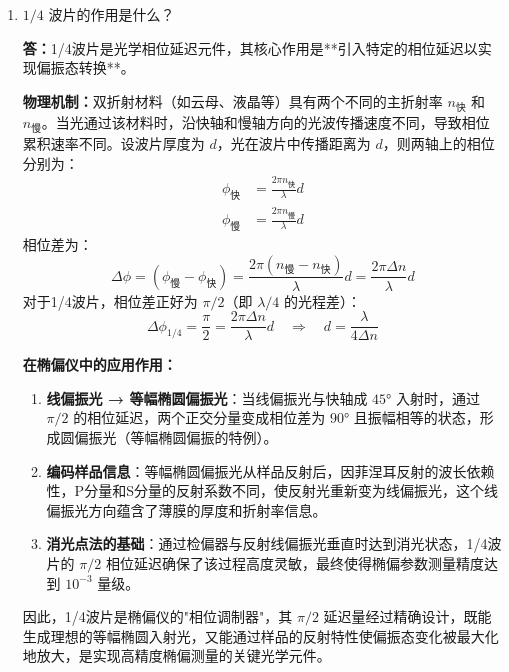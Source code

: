 \documentclass[11pt]{article}
\begin{document}
\begin{enumerate}
    波片对这两个分量引入的相位差为 $\Delta\phi = \frac{2\pi}{\lambda}(n_{慢} - n_{快}) d_{波片}$。对于1/4波片，满足 $\Delta\phi = \pi/2$，即在出射端：
    \begin{equation}
        E_{快}' = \frac{E_0}{\sqrt{2}} e^{i\phi_1}, \quad E_{慢}' = \frac{E_0}{\sqrt{2}} e^{i(\phi_1 + \pi/2)}
    \end{equation}
    
    两个分量在空间中形成垂直关系且振幅相等，相位差为 $\pi/2$，这正是**等幅椭圆偏振光**的定义。其参数方程为：
    \begin{equation}
        x = \frac{E_0}{\sqrt{2}} \cos\omega t, \quad y = \frac{E_0}{\sqrt{2}} \sin\omega t
    \end{equation}
    电矢量的端点在时间演化中描绘出一个圆（等幅椭圆退化为圆）。这种等幅椭圆偏振光具有关键性质：当它从样品表面反射后，P分量和S分量的反射系数差异会使其变成线偏振光，便于进行消光测量。
    
    \item $1/4$ 波片的作用是什么？
    
    \textbf{答：}1/4波片是光学相位延迟元件，其核心作用是**引入特定的相位延迟以实现偏振态转换**。
    
    \textbf{物理机制：}双折射材料（如云母、液晶等）具有两个不同的主折射率 $n_{快}$ 和 $n_{慢}$。当光通过该材料时，沿快轴和慢轴方向的光波传播速度不同，导致相位累积速率不同。设波片厚度为 $d$，光在波片中传播距离为 $d$，则两轴上的相位分别为：
    \begin{align}
        \phi_{快} &= \frac{2\pi n_{快}}{\lambda} d \\
        \phi_{慢} &= \frac{2\pi n_{慢}}{\lambda} d
    \end{align}
    相位差为：
    \begin{equation}
        \Delta\phi = (\phi_{慢} - \phi_{快}) = \frac{2\pi (n_{慢} - n_{快})}{\lambda} d = \frac{2\pi \Delta n}{\lambda} d
    \end{equation}
    对于1/4波片，相位差正好为 $\pi/2$（即 $\lambda/4$ 的光程差）：
    \begin{equation}
        \Delta\phi_{1/4} = \frac{\pi}{2} = \frac{2\pi \Delta n}{\lambda} d \quad \Rightarrow \quad d = \frac{\lambda}{4\Delta n}
    \end{equation}
    
    \textbf{在椭偏仪中的应用作用：}
    \begin{enumerate}
        \item \textbf{线偏振光 → 等幅椭圆偏振光}：当线偏振光与快轴成 $45°$ 入射时，通过 $\pi/2$ 的相位延迟，两个正交分量变成相位差为 $90°$ 且振幅相等的状态，形成圆偏振光（等幅椭圆偏振的特例）。
        \item \textbf{编码样品信息}：等幅椭圆偏振光从样品反射后，因菲涅耳反射的波长依赖性，P分量和S分量的反射系数不同，使反射光重新变为线偏振光，这个线偏振光方向蕴含了薄膜的厚度和折射率信息。
        \item \textbf{消光点法的基础}：通过检偏器与反射线偏振光垂直时达到消光状态，1/4波片的 $\pi/2$ 相位延迟确保了该过程高度灵敏，最终使得椭偏参数测量精度达到 $10^{-3}$ 量级。
    \end{enumerate}
    
    因此，1/4波片是椭偏仪的"相位调制器"，其 $\pi/2$ 延迟量经过精确设计，既能生成理想的等幅椭圆入射光，又能通过样品的反射特性使偏振态变化被最大化地放大，是实现高精度椭偏测量的关键光学元件。
\end{enumerate}
\end{document}
